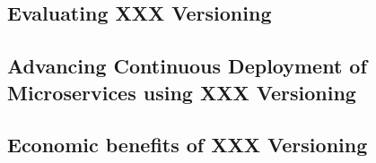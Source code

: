 

\subsection{Evaluating XXX Versioning}%
\label{sub:Evaluating_XXX_Versioning}

\subsection{Advancing Continuous Deployment of Microservices using XXX Versioning}%
\label{sub:Advancing_Continuous_Deployment_of_Microservices_using_XXX_Versioning}

\subsection{Economic benefits of XXX Versioning}%
\label{sub:Economic_benefits_of_XXX_Versioning}

